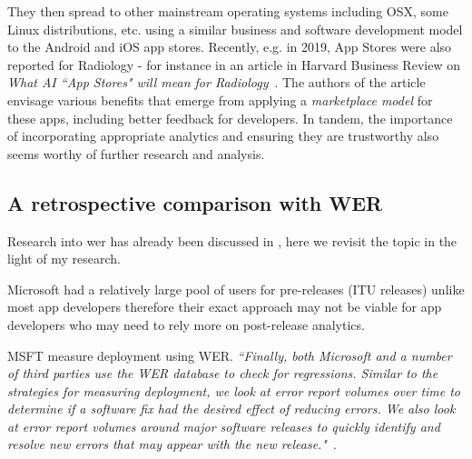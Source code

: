 
They then spread to other mainstream operating systems including OSX, some Linux distributions, etc. using a similar business and software development model to the Android and iOS app stores. Recently, e.g. in 2019, App Stores were also reported for Radiology - for instance in an article in Harvard Business Review on \emph{What AI ``App Stores" will mean for Radiology}~\cite{hbr_what_ai_app_stores_mean_for_radiology}. The authors of the article envisage various benefits that emerge from applying a \emph{marketplace model} for these apps, including better feedback for developers. In tandem, the importance of incorporating appropriate analytics and ensuring they are trustworthy also seems worthy of further research and analysis. 

\subsection{A retrospective comparison with WER}
Research into \acrfull{wer} has already been discussed in , here we revisit the topic in the light of my research.



Microsoft had a relatively large pool of users for pre-releases (ITU releases) unlike most app developers therefore their exact approach may not be viable for app developers who may need to rely more on post-release analytics.


MSFT measure deployment using WER. \emph{``Finally, both Microsoft and a number of third parties use the WER database to check for regressions. Similar to the strategies for measuring deployment, we look at error report volumes over time to determine if a software fix had the desired effect of reducing errors. We also look at error report volumes around major software releases to quickly identify and resolve new errors that may appear with the new release."}~.

